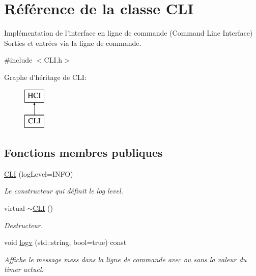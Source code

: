 \hypertarget{classCLI}{\section{Référence de la classe C\-L\-I}
\label{classCLI}
}


Implémentation de l'interface en ligne de commande (Command Line Interface) Sorties et entrées via la ligne de commande.  




{\ttfamily \#include $<$C\-L\-I.\-h$>$}

Graphe d'héritage de C\-L\-I\-:\begin{figure}[H]
\begin{center}
\leavevmode
\includegraphics[height=2.000000cm]{classCLI}
\end{center}
\end{figure}
\subsection*{Fonctions membres publiques}
\begin{DoxyCompactItemize}
\item 
\hyperlink{classCLI_ab29c9ac6d7c2e6b25eeacf0c5fc144a9}{C\-L\-I} (log\-Level=I\-N\-F\-O)
\begin{DoxyCompactList}\small\item\em Le constructeur qui définit le log level. \end{DoxyCompactList}\item 
\hypertarget{classCLI_a9f59d57abf434f7161fcf3f61b725752}{virtual \hyperlink{classCLI_a9f59d57abf434f7161fcf3f61b725752}{$\sim$\-C\-L\-I} ()}\label{classCLI_a9f59d57abf434f7161fcf3f61b725752}

\begin{DoxyCompactList}\small\item\em Destructeur. \end{DoxyCompactList}\item 
\hypertarget{classCLI_a844e89b9d79ecf64b1a52cc80fb42663}{void \hyperlink{classCLI_a844e89b9d79ecf64b1a52cc80fb42663}{logv} (std\-::string, bool=true) const }\label{classCLI_a844e89b9d79ecf64b1a52cc80fb42663}

\begin{DoxyCompactList}\small\item\em Affiche le message mess dans la ligne de commande avec ou sans la valeur du timer actuel. \end{DoxyCompactList}\end{DoxyCompactItemize}
